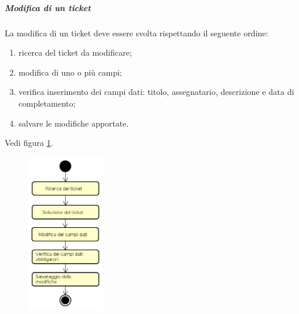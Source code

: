             \subparagraph{Modifica di un ticket}\label{sec:modificaticket}
                La modifica di un ticket deve essere svolta rispettando il seguente ordine:
                \begin{enumerate}
                	\item ricerca del ticket da modificare;
                	\item modifica di uno o più campi;
                	\item verifica inserimento dei campi dati: titolo, assegnatario, descrizione e data di completamento;
                	\item salvare le modifiche apportate.
                \end{enumerate}
                Vedi figura \ref{fig:procmodticket}.
                    \begin{figure}[h!]
                        \centering
        	        	\includegraphics[width=0.3\textwidth]{img/proc_mod_ticket}
                        \label{fig:procmodticket}
        	        \end{figure}\mbox{}\\
